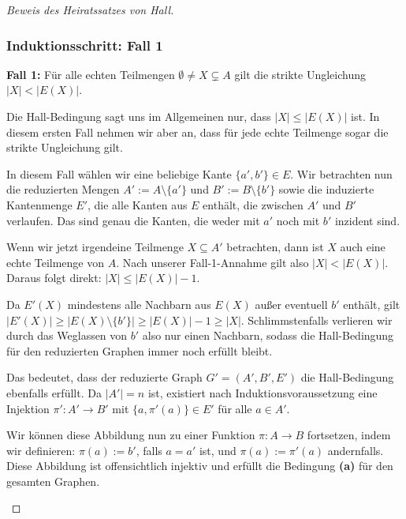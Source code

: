 \begin{proof}[Beweis des Heiratssatzes von Hall]
\subsubsection{Induktionsschritt: Fall 1}

\begin{spoken-clean}[01:06:32 - 01:08:47]
\textbf{Fall 1:} Für alle echten Teilmengen $\emptyset \neq X \subsetneq A$ gilt die strikte Ungleichung $|X| < |E(X)|$.

Die Hall-Bedingung sagt uns im Allgemeinen nur, dass $|X| \le |E(X)|$ ist. In diesem ersten Fall nehmen wir aber an, dass für jede echte Teilmenge sogar die strikte Ungleichung gilt.

In diesem Fall wählen wir eine beliebige Kante $\{a', b'\} \in E$. Wir betrachten nun die reduzierten Mengen $A' := A \setminus \{a'\}$ und $B' := B \setminus \{b'\}$ sowie die induzierte Kantenmenge $E'$, die alle Kanten aus $E$ enthält, die zwischen $A'$ und $B'$ verlaufen. Das sind genau die Kanten, die weder mit $a'$ noch mit $b'$ inzident sind.
\end{spoken-clean}

\begin{spoken-clean}[01:08:47 - 01:10:52]
Wenn wir jetzt irgendeine Teilmenge $X \subseteq A'$ betrachten, dann ist $X$ auch eine echte Teilmenge von $A$. Nach unserer Fall-1-Annahme gilt also $|X| < |E(X)|$. Daraus folgt direkt: $|X| \le |E(X)| - 1$.

Da $E'(X)$ mindestens alle Nachbarn aus $E(X)$ außer eventuell $b'$ enthält, gilt $|E'(X)| \ge |E(X) \setminus \{b'\}| \ge |E(X)| - 1 \ge |X|$. Schlimmstenfalls verlieren wir durch das Weglassen von $b'$ also nur einen Nachbarn, sodass die Hall-Bedingung für den reduzierten Graphen immer noch erfüllt bleibt.

Das bedeutet, dass der reduzierte Graph $G' = (A', B', E')$ die Hall-Bedingung ebenfalls erfüllt. Da $|A'| = n$ ist, existiert nach Induktionsvoraussetzung eine Injektion $\pi' \colon A' \to B'$ mit $\{a, \pi'(a)\} \in E'$ für alle $a \in A'$.

Wir können diese Abbildung nun zu einer Funktion $\pi \colon A \to B$ fortsetzen, indem wir definieren: $\pi(a) := b'$, falls $a = a'$ ist, und $\pi(a) := \pi'(a)$ andernfalls. Diese Abbildung ist offensichtlich injektiv und erfüllt die Bedingung \textbf{(a)} für den gesamten Graphen.
\end{spoken-clean}


\end{proof}
